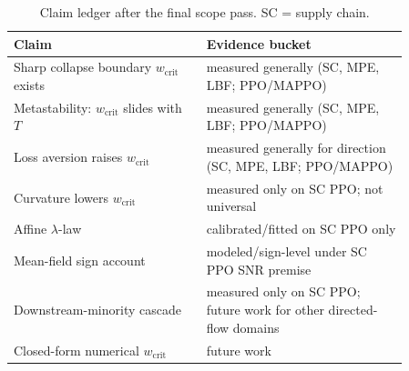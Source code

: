 \documentclass[letterpaper]{article} %
\theoremstyle{plain}
\newcommand{\wcrit}{w_{\mathrm{crit}}}
\begin{document}
\begin{table}[h]
\centering \small
\caption{Claim ledger after the final scope pass. SC = supply chain.}
\label{tab:claim_ledger}
\begin{tabular}{p{0.42\linewidth}p{0.44\linewidth}}
\toprule
Claim & Evidence bucket \\
\midrule
Sharp collapse boundary $\wcrit$ exists & measured generally (SC, MPE, LBF; PPO/MAPPO) \\
Metastability: $\wcrit$ slides with $T$ & measured generally (SC, MPE, LBF; PPO/MAPPO) \\
Loss aversion raises $\wcrit$ & measured generally for direction (SC, MPE, LBF; PPO/MAPPO) \\
Curvature lowers $\wcrit$ & measured only on SC PPO; not universal \\
Affine $\lambda$-law & calibrated/fitted on SC PPO only \\
Mean-field sign account & modeled/sign-level under SC PPO SNR premise \\
Downstream-minority cascade & measured only on SC PPO; future work for other directed-flow domains \\
Closed-form numerical $\wcrit$ & future work \\
\bottomrule
\end{tabular}
\end{table}


\end{document}
